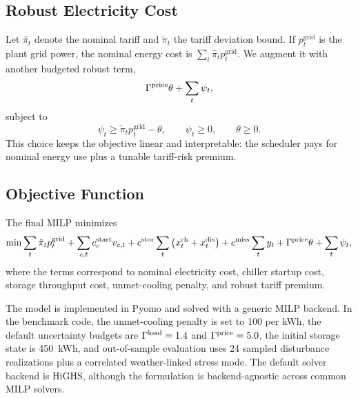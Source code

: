 \subsection{Robust Electricity Cost}

Let $\hat{\pi}_t$ denote the nominal tariff and $\tilde{\pi}_t$ the tariff deviation bound. If $p^{\mathrm{grid}}_t$ is the plant grid power, the nominal energy cost is $\sum_t \hat{\pi}_t p^{\mathrm{grid}}_t$. We augment it with another budgeted robust term,
\begin{equation}
\Gamma^{\mathrm{price}} \theta + \sum_t \psi_t,
\end{equation}
subject to
\begin{equation}
\psi_t \ge \tilde{\pi}_t p^{\mathrm{grid}}_t - \theta, \qquad \psi_t \ge 0, \qquad \theta \ge 0.
\end{equation}
This choice keeps the objective linear and interpretable: the scheduler pays for nominal energy use plus a tunable tariff-risk premium.

\subsection{Objective Function}

The final MILP minimizes
\begin{equation}
\min \sum_t \hat{\pi}_t p^{\mathrm{grid}}_t
+ \sum_{c,t} c^{\mathrm{start}}_c v_{c,t}
+ c^{\mathrm{stor}} \sum_t \left( x^{\mathrm{ch}}_t + x^{\mathrm{dis}}_t \right)
+ c^{\mathrm{miss}} \sum_t y_t
+ \Gamma^{\mathrm{price}} \theta + \sum_t \psi_t,
\end{equation}
where the terms correspond to nominal electricity cost, chiller startup cost, storage throughput cost, unmet-cooling penalty, and robust tariff premium.

The model is implemented in Pyomo and solved with a generic MILP backend. In the benchmark code, the unmet-cooling penalty is set to 100 per kWh, the default uncertainty budgets are $\Gamma^{\mathrm{load}}=1.4$ and $\Gamma^{\mathrm{price}}=5.0$, the initial storage state is 450~kWh, and out-of-sample evaluation uses 24 sampled disturbance realizations plus a correlated weather-linked stress mode. The default solver backend is HiGHS, although the formulation is backend-agnostic across common MILP solvers.
